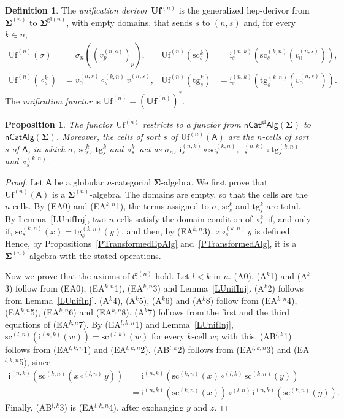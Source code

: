 \documentclass[a4paper,reqno]{amsart}
\newcommand{\sig}[1]{\mathbf{#1}}                %
\newcommand{\calg}[1]{\boldsymbol{\mathsf{#1}}}  %
\newcommand{\gl}{\mathrm{gl}}
\newcommand{\src}{\mathrm{sc}}
\newcommand{\tgt}{\mathrm{tg}}
\newcommand{\ii}{\mathrm{i}}
\newcommand{\Uf}{\mathrm{Uf}}
\newcommand{\bUf}{\mathbf{Uf}}
\theoremstyle{plain}
\newtheorem{proposition}[theorem]{Proposition}
\theoremstyle{definition}
\newtheorem{definition}[theorem]{Definition}
\begin{document}
\begin{definition}\label{DUnifDerivor}
The \emph{unification derivor} $\bUf^{(n)}$ is the generalized hep-derivor from $\sig{\Sigma}^{(n)}$ to $\sig{\Sigma}^{\gl(n)}$, with empty domains, that sends $s$ to $(n,s)$ and, for every $k\in n$,
\begin{align*}
\Uf^{(n)}(\sigma)&=\sigma_{n}((v^{(n,\mathbf{s})}_{p})_{p}), &
\Uf^{(n)}(\src^{k}_{s})&=\ii^{(n,k)}_{s}(\src^{(k,n)}_{s}(v^{(n,s)}_{0})),\\
\Uf^{(n)}(\circ^{k}_{s})&=v^{(n,s)}_{0}\circ^{(k,n)}_{s}v^{(n,s)}_{1}, &
\Uf^{(n)}(\tgt^{k}_{s})&=\ii^{(n,k)}_{s}(\tgt^{(k,n)}_{s}(v^{(n,s)}_{0})).
\end{align*}
The \emph{unification functor} is $\Uf^{(n)}=(\bUf^{(n)})^{\ast}$.
\end{definition}

\begin{proposition}\label{PUnifDerivor}
The functor $\Uf^{(n)}$ restricts to a functor from $\mathsf{nCat}^{\gl}\mathsf{Alg}(\sig{\Sigma})$ to $\mathsf{nCatAlg}(\sig{\Sigma})$.
Moreover, the cells of sort $s$ of $\Uf^{(n)}(\calg{A})$ are the $n$-cells of sort $s$ of $\calg{A}$, in which $\sigma$, $\src^{k}_{s}$, $\tgt^{k}_{s}$ and $\circ^{k}_{s}$ act as $\sigma_{n}$, $\ii^{(n,k)}_{s}\circ\src^{(k,n)}_{s}$, $\ii^{(n,k)}_{s}\circ\tgt^{(k,n)}_{s}$ and $\circ^{(k,n)}_{s}$.
\end{proposition}
\begin{proof}
Let $\calg{A}$ be a globular $n$-categorial $\sig{\Sigma}$-algebra.
We first prove that $\Uf^{(n)}(\calg{A})$ is a $\sig{\Sigma}^{(n)}$-algebra.
The domains are empty, so that the cells are the $n$-cells.
By (EA0) and (EA$^{k,n}$1), the terms assigned to $\sigma$, $\src^{k}_{s}$ and $\tgt^{k}_{s}$ are total.
By Lemma~\ref{LUnifInj}, two $n$-cells satisfy the domain condition of $\circ^{k}_{s}$ if, and only if, $\src^{(k,n)}_{s}(x)=\tgt^{(k,n)}_{s}(y)$, and then, by (EA$^{k,n}$3), $x\circ^{(k,n)}_{s}y$ is defined.
Hence, by Propositions~\ref{PTransformedEpAlg} and~\ref{PTransformedAlg}, it is a $\sig{\Sigma}^{(n)}$-algebra with the stated operations.

Now we prove that the axioms of $\mathcal{C}^{(n)}$ hold.
Let $l<k$ in $n$.
(A0), (A$^{k}$1) and (A$^{k}$3) follow from (EA0), (EA$^{k,n}$1), (EA$^{k,n}$3) and Lemma~\ref{LUnifInj}.
(A$^{k}$2) follows from Lemma~\ref{LUnifInj}.
(A$^{k}$4), (A$^{k}$5), (A$^{k}$6) and (A$^{k}$8) follow from (EA$^{k,n}$4), (EA$^{k,n}$5), (EA$^{k,n}$6) and (EA$^{k,n}$8).
(A$^{k}$7) follows from the first and the third equations of (EA$^{k,n}$7).
By (EA$^{l,k,n}$1) and Lemma~\ref{LUnifInj}, $\src^{(l,n)}(\ii^{(n,k)}(w))=\src^{(l,k)}(w)$ for every $k$-cell $w$; with this, (AB$^{l,k}$1) follows from (EA$^{l,k,n}$1) and (EA$^{l,k,n}$2).
(AB$^{l,k}$2) follows from (EA$^{l,k,n}$3) and (EA$^{l,k,n}$5), since
\begin{align*}
\ii^{(n,k)}(\src^{(k,n)}(x\circ^{(l,n)}y))
&=\ii^{(n,k)}(\src^{(k,n)}(x)\circ^{(l,k)}\src^{(k,n)}(y))
\\&=\ii^{(n,k)}(\src^{(k,n)}(x))\circ^{(l,n)}\ii^{(n,k)}(\src^{(k,n)}(y)).
\end{align*}
Finally, (AB$^{l,k}$3) is (EA$^{l,k,n}$4), after exchanging $y$ and $z$.
\end{proof}
\end{document}
